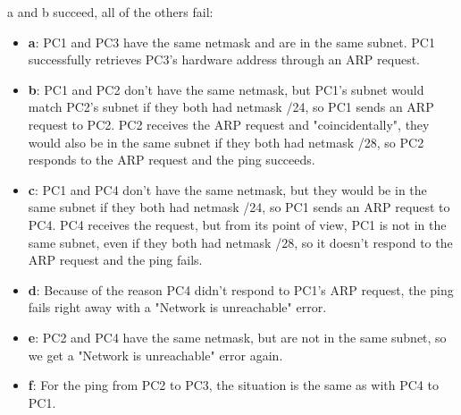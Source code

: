 a and b succeed, all of the others fail: \\
\begin{itemize}
\item \textbf{a}: PC1 and PC3 have the same netmask and are in the same subnet. PC1 successfully retrieves PC3's hardware address through an ARP request. \\
\item \textbf{b}: PC1 and PC2 don't have the same netmask, but PC1's subnet would match PC2's subnet if they both had netmask /24, so PC1 sends an ARP request to PC2. PC2 receives the ARP request and "coincidentally", they would also be in the same subnet if they both had netmask /28, so PC2 responds to the ARP request and the ping succeeds. \\
\item \textbf{c}: PC1 and PC4 don't have the same netmask, but they would be in the same subnet if they both had netmask /24, so PC1 sends an ARP request to PC4. PC4 receives the request, but from its point of view, PC1 is not in the same subnet, even if they both had netmask /28, so it doesn't respond to the ARP request and the ping fails. \\
\item \textbf{d}: Because of the reason PC4 didn't respond to PC1's ARP request, the ping fails right away with a "Network is unreachable" error. \\
\item \textbf{e}: PC2 and PC4 have the same netmask, but are not in the same subnet, so we get a "Network is unreachable" error again. \\
\item \textbf{f}: For the ping from PC2 to PC3, the situation is the same as with PC4 to PC1.
\end{itemize}
